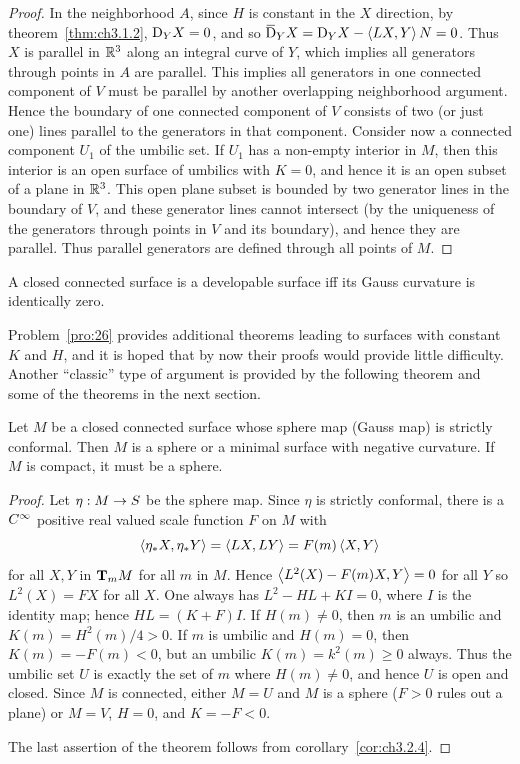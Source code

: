 \documentclass[../main]{subfiles}
\begin{document}
\begin{proof}
In the neighborhood $A$, since $H$ is constant in the $X$ direction, by theorem~\ref{thm:ch3.1.2}, $\connection_Y X = 0$, and so $\covariant_Y X = \connection_Y X - \ip {LX} Y N = 0$. Thus $X$ is parallel in $\bbR^3$ along an integral curve of $Y$, which implies all generators through points in $A$ are parallel. This implies all generators in one connected component of $V$ must be parallel by another overlapping neighborhood argument. Hence the boundary of one connected component of $V$ consists of two (or just one) lines parallel to the generators in that component. Consider now a connected component $U_1$ of the umbilic set. If $U_1$ has a non-empty interior in $M$, then this interior is an open surface of umbilics with $K = 0$, and hence it is an open subset of a plane in $\bR^{3}$. This open plane subset is bounded by two generator lines in the boundary of $V$, and these generator lines cannot intersect (by the uniqueness of the generators through points in $V$ and its boundary), and hence they are parallel. Thus parallel generators are defined through all points of $M$.
\end{proof}



\begin{corollary} \label{cor:ch3.2.7}
A closed connected surface is a developable surface iff its Gauss curvature is identically zero.
\end{corollary}



Problem~\ref{pro:26} provides additional theorems leading to surfaces with constant $K$ and $H$, and it is hoped that by now their proofs would provide little difficulty. Another ``classic'' type of argument is provided by the following theorem and some of the theorems in the next section.



\begin{theorem} \label{thm:ch3.2.8}
Let $M$ be a closed connected surface whose sphere map (Gauss map) is strictly conformal. Then $M$ is a sphere or a minimal surface with negative curvature. If $M$ is compact, it must be a sphere.
\end{theorem}

\begin{proof}
Let $\eta : M \functionMaps S$ be the sphere map. Since $\eta$ is strictly conformal, there is a $\CInfty$ positive real valued scale function $F$ on $M$ with \[\ip {\eta_\ast X} {\eta_\ast Y} = \ip {LX} {LY} = F(m) \ip X Y\] for all $X, Y$ in $\tangentspace M m$ for all $m$ in $M$. Hence $\ip {L^2(X) - F(m) X} Y = 0$ for all $Y$ so $L^2(X) = FX$ for all $X$. One always has $L^2 - HL + KI = 0$, where $I$ is the identity map; hence $HL = (K + F)I$. If $H(m) \ne 0$, then $m$ is an umbilic and $K(m) = H^2(m)/4 > 0$. If $m$ is umbilic and $H(m) = 0$, then $K(m) = -F(m) < 0$, but an umbilic $K(m) = k^2(m) \ge 0$ always. Thus the umbilic set $U$ is exactly the set of $m$ where $H(m) \ne 0$, and hence $U$ is open and closed. Since $M$ is connected, either $M = U$ and $M$ is a sphere ($F > 0$ rules out a plane) or $M = V$, $H = 0$, and $K = -F < 0$. 

The last assertion of the theorem follows from corollary~\ref{cor:ch3.2.4}.
\end{proof}
\end{document}
